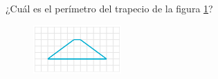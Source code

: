
¿Cuál es el perímetro del trapecio de la figura \ref{fig:peri_trap_03}?
\begin{figure}[H]
    \begin{center}
        \includegraphics[width=0.3\textwidth]{../images/peri_trap_03.png}
    \end{center}
    \caption{}
    \label{fig:peri_trap_03}
\end{figure}
